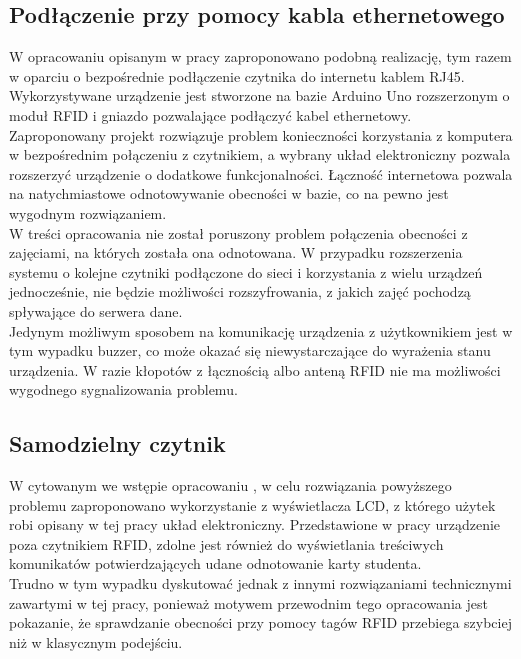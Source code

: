 \documentclass[declaration,shortabstract, mgr]{iithesis}
\begin{document}
\subsection{Podłączenie przy pomocy kabla ethernetowego}
\indent W opracowaniu opisanym w pracy \cite{ethernet} zaproponowano podobną realizację, tym razem w oparciu o bezpośrednie podłączenie czytnika do internetu kablem RJ45. Wykorzystywane urządzenie jest stworzone na bazie Arduino Uno rozszerzonym o moduł RFID i gniazdo pozwalające podłączyć kabel ethernetowy. \\
\indent Zaproponowany projekt rozwiązuje problem konieczności korzystania z komputera w bezpośrednim połączeniu z czytnikiem, a wybrany układ elektroniczny pozwala rozszerzyć urządzenie o dodatkowe funkcjonalności. Łączność internetowa pozwala na natychmiastowe odnotowywanie obecności w bazie, co na pewno jest wygodnym rozwiązaniem. \\
\indent W treści opracowania nie został poruszony problem połączenia obecności z zajęciami, na których została ona odnotowana. W przypadku rozszerzenia systemu o kolejne czytniki podłączone do sieci i korzystania z wielu urządzeń jednocześnie, nie będzie możliwości rozszyfrowania, z jakich zajęć pochodzą spływające do serwera dane. \\
\indent Jedynym możliwym sposobem na komunikację urządzenia z użytkownikiem jest w tym wypadku buzzer, co może okazać się niewystarczające do wyrażenia stanu urządzenia. W razie kłopotów z łącznością albo anteną RFID nie ma możliwości wygodnego sygnalizowania problemu.

\subsection{Samodzielny czytnik }
\indent W cytowanym we wstępie opracowaniu \cite{lcd}, w celu rozwiązania powyższego problemu zaproponowano wykorzystanie z wyświetlacza LCD, z którego użytek robi opisany w tej pracy układ elektroniczny. Przedstawione w pracy urządzenie poza czytnikiem RFID, zdolne jest również do wyświetlania treściwych komunikatów potwierdzających udane odnotowanie karty studenta. \\
\indent Trudno w tym wypadku dyskutować jednak z innymi rozwiązaniami technicznymi zawartymi w tej pracy, ponieważ motywem przewodnim tego opracowania jest pokazanie, że sprawdzanie obecności przy pomocy tagów RFID przebiega szybciej niż w klasycznym podejściu.
\end{document}
